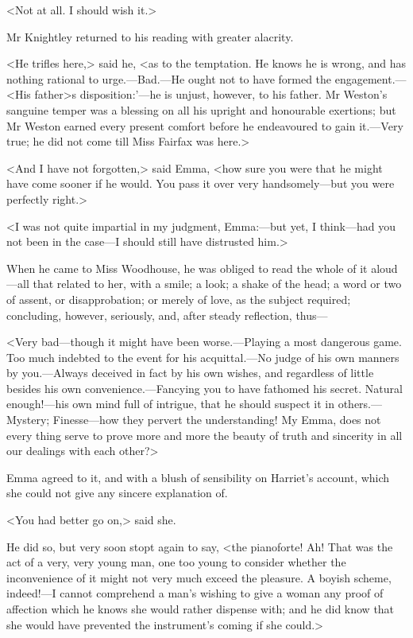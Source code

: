 <Not at all. I should wish it.>

Mr Knightley returned to his reading with greater alacrity.

<He trifles here,> said he, <as to the temptation. He knows he is wrong, and has nothing rational to urge.—Bad.—He ought not to have formed the engagement.—<His father>s disposition:'—he is unjust, however, to his father. Mr Weston's sanguine temper was a blessing on all his upright and honourable exertions; but Mr Weston earned every present comfort before he endeavoured to gain it.—Very true; he did not come till Miss Fairfax was here.>

<And I have not forgotten,> said Emma, <how sure you were that he might have come sooner if he would. You pass it over very handsomely—but you were perfectly right.>

<I was not quite impartial in my judgment, Emma:—but yet, I think—had you not been in the case—I should still have distrusted him.>

When he came to Miss Woodhouse, he was obliged to read the whole of it aloud—all that related to her, with a smile; a look; a shake of the head; a word or two of assent, or disapprobation; or merely of love, as the subject required; concluding, however, seriously, and, after steady reflection, thus—

<Very bad—though it might have been worse.—Playing a most dangerous game. Too much indebted to the event for his acquittal.—No judge of his own manners by you.—Always deceived in fact by his own wishes, and regardless of little besides his own convenience.—Fancying you to have fathomed his secret. Natural enough!—his own mind full of intrigue, that he should suspect it in others.—Mystery; Finesse—how they pervert the understanding! My Emma, does not every thing serve to prove more and more the beauty of truth and sincerity in all our dealings with each other?>

Emma agreed to it, and with a blush of sensibility on Harriet's account, which she could not give any sincere explanation of.

<You had better go on,> said she.

He did so, but very soon stopt again to say, <the pianoforte! Ah! That was the act of a very, very young man, one too young to consider whether the inconvenience of it might not very much exceed the pleasure. A boyish scheme, indeed!—I cannot comprehend a man's wishing to give a woman any proof of affection which he knows she would rather dispense with; and he did know that she would have prevented the instrument's coming if she could.>


